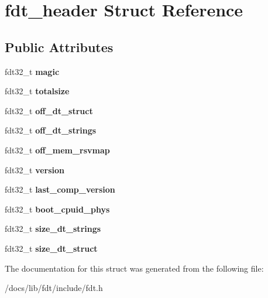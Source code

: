 \hypertarget{structfdt__header}{}\section{fdt\+\_\+header Struct Reference}
\label{structfdt__header}
\subsection*{Public Attributes}
\begin{DoxyCompactItemize}
\item 
\mbox{\label{structfdt__header_a65fb0559969843780cf6d3192952af0a}} 
fdt32\+\_\+t {\bfseries magic}
\item 
\mbox{\label{structfdt__header_a142ef62b173b9e13c512bbb231106345}} 
fdt32\+\_\+t {\bfseries totalsize}
\item 
\mbox{\label{structfdt__header_a350b29eb98ea9ab1df4379e19d9f6a08}} 
fdt32\+\_\+t {\bfseries off\+\_\+dt\+\_\+struct}
\item 
\mbox{\label{structfdt__header_a4eb64188c5a8fecc9eb0acac4a0ac002}} 
fdt32\+\_\+t {\bfseries off\+\_\+dt\+\_\+strings}
\item 
\mbox{\label{structfdt__header_aceb981c230e48eea58d9501b2a52fada}} 
fdt32\+\_\+t {\bfseries off\+\_\+mem\+\_\+rsvmap}
\item 
\mbox{\label{structfdt__header_a5df82a5fef43c5d827478d41e78ed649}} 
fdt32\+\_\+t {\bfseries version}
\item 
\mbox{\label{structfdt__header_a230fb2743cc67cc1dd20d7e92fddae1e}} 
fdt32\+\_\+t {\bfseries last\+\_\+comp\+\_\+version}
\item 
\mbox{\label{structfdt__header_ac2746c258f91f98614e281b078863d00}} 
fdt32\+\_\+t {\bfseries boot\+\_\+cpuid\+\_\+phys}
\item 
\mbox{\label{structfdt__header_a64c5ed9e447a81137bf30a6bc3c627ee}} 
fdt32\+\_\+t {\bfseries size\+\_\+dt\+\_\+strings}
\item 
\mbox{\label{structfdt__header_a5d7585b3780d6e983fe0924a0e23ffcb}} 
fdt32\+\_\+t {\bfseries size\+\_\+dt\+\_\+struct}
\end{DoxyCompactItemize}


The documentation for this struct was generated from the following file\+:\begin{DoxyCompactItemize}
\item 
/docs/lib/fdt/include/fdt.\+h\end{DoxyCompactItemize}
